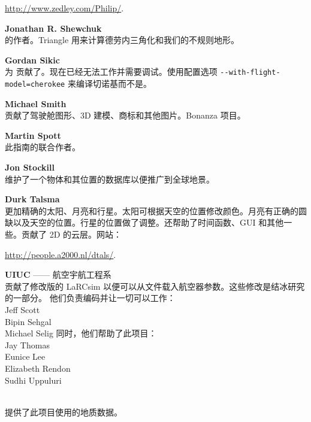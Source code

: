   \href{http://www.zedley.com/Philip/}{http://www.zedley.com/Philip/}.
  \medskip

\noindent \textbf{Jonathan R. Shewchuk}\\
的作者。Triangle 用来计算德劳内三角化和我们的不规则地形。
 \medskip

\noindent \textbf{Gordan Sikic}\\
为  贡献了。现在已经无法工作并需要调试。使用配置选项 \texttt{-$ $-with-flight-model=cherokee} 来编译切诺基而不是。
 \medskip

\noindent \textbf{Michael Smith}\\
贡献了驾驶舱图形、3D 建模、商标和其他图片。Bonanza 项目。
   \medskip

\noindent \textbf{Martin Spott}\\
此指南的联合作者。
  \medskip

\noindent \textbf{Jon Stockill}\\
维护了一个物体和其位置的数据库以便推广到全球地景。
\medskip

\noindent \textbf{Durk Talsma}\\
更加精确的太阳、月亮和行星。太阳可根据天空的位置修改颜色。月亮有正确的圆缺以及天空的位置。行星的位置做了调整。还帮助了时间函数、GUI 和其他一些。贡献了 2D 的云层。网站：
   \medskip

 \href{http://people.a2000.nl/dtals/}{http://people.a2000.nl/dtals/}.
 \medskip

\noindent \textbf{UIUC} —— 航空宇航工程系\\
贡献了修改版的 LaRCsim 以便可以从文件载入航空器参数。这些修改是结冰研究的一部分。
  \medskip
\noindent
他们负责编码并让一切可以工作：\\
      Jeff Scott\\
      Bipin Sehgal\\
      Michael Selig
  \medskip
\noindent
同时，他们帮助了此项目：\\
      Jay Thomas\\
      Eunice Lee\\
      Elizabeth Rendon\\
      Sudhi Uppuluri
  \medskip

\noindent
 \textbf{}\\
  \medskip
提供了此项目使用的地质数据。
 \medskip


